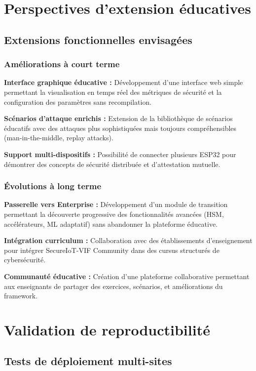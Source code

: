\section{Perspectives d'extension éducatives}

\subsection{Extensions fonctionnelles envisagées}

\subsubsection{Améliorations à court terme}

\textbf{Interface graphique éducative :} Développement d'une interface web simple permettant la visualisation en temps réel des métriques de sécurité et la configuration des paramètres sans recompilation.

\textbf{Scénarios d'attaque enrichis :} Extension de la bibliothèque de scénarios éducatifs avec des attaques plus sophistiquées mais toujours compréhensibles (man-in-the-middle, replay attacks).

\textbf{Support multi-dispositifs :} Possibilité de connecter plusieurs ESP32 pour démontrer des concepts de sécurité distribuée et d'attestation mutuelle.

\subsubsection{Évolutions à long terme}

\textbf{Passerelle vers Enterprise :} Développement d'un module de transition permettant la découverte progressive des fonctionnalités avancées (HSM, accélérateurs, ML adaptatif) sans abandonner la plateforme éducative.

\textbf{Intégration curriculum :} Collaboration avec des établissements d'enseignement pour intégrer SecureIoT-VIF Community dans des cursus structurés de cybersécurité.

\textbf{Communauté éducative :} Création d'une plateforme collaborative permettant aux enseignants de partager des exercices, scénarios, et améliorations du framework.

\section{Validation de reproductibilité}

\subsection{Tests de déploiement multi-sites}

